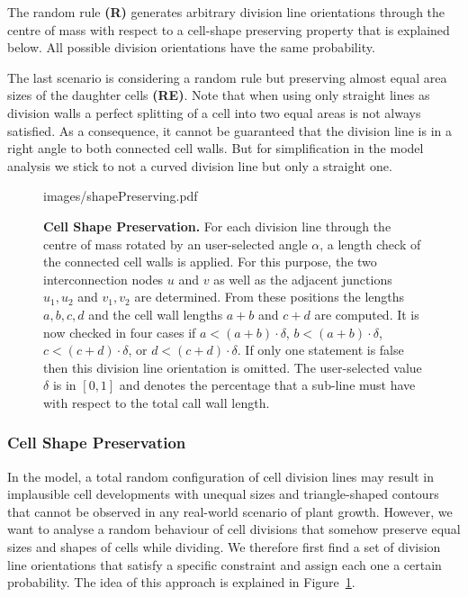 \documentclass[11pt,a4paper, draft]{article}
\begin{document}
The random rule \textbf{(R)} generates arbitrary division line orientations through the centre of mass with respect to a cell-shape preserving property that is explained below. All possible division orientations have the same probability.

The last scenario is considering a random rule but preserving almost equal area sizes of the daughter cells \textbf{(RE)}. Note that when using only straight lines as division walls a perfect splitting of a cell into two equal areas is not always satisfied. As a consequence, it cannot be guaranteed that the division line is in a right angle to both connected cell walls. But for simplification in the model analysis we stick to not a curved division line but only a straight one.

%
\begin{figure}[htbp]
	\begin{center}
		\begin{overpic}[width=1.\linewidth]{images/shapePreserving.pdf}
		\end{overpic}
\caption[Cell Shape Preservation.]
{
{\bf Cell Shape Preservation.} For each division line through the centre of mass rotated by an user-selected angle $\alpha$, a length check of the connected cell walls is applied. For this purpose, the two interconnection nodes $u$ and $v$ as well as the adjacent junctions $u_1, u_2$ and $v_1, v_2$ are determined. From these positions the lengths $a, b, c, d$ and the cell wall lengths $a+b$ and $c+d$ are computed. It is now checked in four cases if $a < (a+b)\cdot \delta$, $b < (a+b)\cdot \delta$, $c < (c+d)\cdot \delta$, or $d < (c+d)\cdot \delta$. If only one statement is false then this division line orientation is omitted. The user-selected value $\delta$ is in $[0,1]$ and denotes the percentage that a sub-line must have with respect to the total call wall length.
}
	\label{fig:shapePreserving}
	\end{center}
\end{figure}
%

\subsubsection{Cell Shape Preservation}
\noindent
In the model, a total random configuration of cell division lines may result in implausible cell developments with unequal sizes and triangle-shaped contours that cannot be observed in any real-world scenario of plant growth. However, we want to analyse a random behaviour of cell divisions that somehow preserve equal sizes and shapes of cells while dividing. We therefore first find a set of division line orientations that satisfy a specific constraint and assign each one a certain probability. The idea of this approach is explained in Figure~\ref{fig:shapePreserving}.
\end{document}
